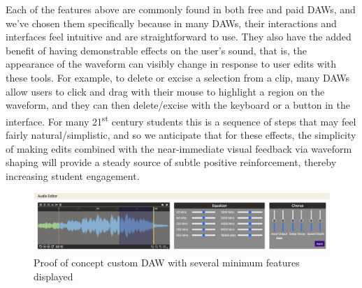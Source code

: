 \documentclass[manuscript,screen,review]{acmart}
\begin{document}
\newpage

Each of the features above are commonly found in both free and paid DAWs, and we've chosen them specifically because in many DAWs, their interactions and interfaces feel intuitive and are straightforward to use.
They also have the added benefit of having demonstrable effects on the user's sound, that is, the appearance of the waveform can visibly change in response to user edits with these tools.
For example, to delete or excise a selection from a clip, many DAWs allow users to click and drag with their mouse to highlight a region on the waveform, and they can then delete/excise with the keyboard or a button in the interface.
For many 21\textsuperscript{st} century students this is a sequence of steps that may feel fairly natural/simplistic, and so we anticipate that for these effects, the simplicity of making edits combined with the near-immediate visual feedback via waveform shaping will provide a steady source of subtle positive reinforcement, thereby increasing student engagement.

\begin{figure}[H]
    \centering
    \includegraphics[width=1\linewidth]{proposal//images/features-1.png}
    \caption{Proof of concept custom DAW with several minimum features displayed}
\end{figure}
\end{document}
